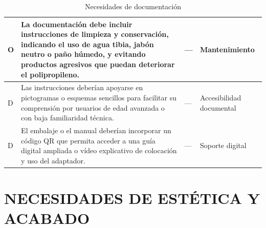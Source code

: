 \documentclass[11pt,a4paper]{article}
\begin{document}
\begin{table}[H]
\begin{tabular}{|p{2.8cm}|p{5.5cm}|p{2.5cm}|p{3.0cm}|}
\hline
O & La documentación debe incluir instrucciones de limpieza y conservación, indicando el uso de agua tibia, jabón neutro o paño húmedo, y evitando productos agresivos que puedan deteriorar el polipropileno. & --- & Mantenimiento \\
\hline
D & Las instrucciones deberían apoyarse en pictogramas o esquemas sencillos para facilitar su comprensión por usuarios de edad avanzada o con baja familiaridad técnica. & --- & Accesibilidad documental \\
\hline
D & El embalaje o el manual deberían incorporar un código QR que permita acceder a una guía digital ampliada o vídeo explicativo de colocación y uso del adaptador. & --- & Soporte digital \\
\hline
\end{tabular}
\caption{Necesidades de documentación}
\end{table}

\newpage

\section{NECESIDADES DE ESTÉTICA Y ACABADO}
\end{document}
